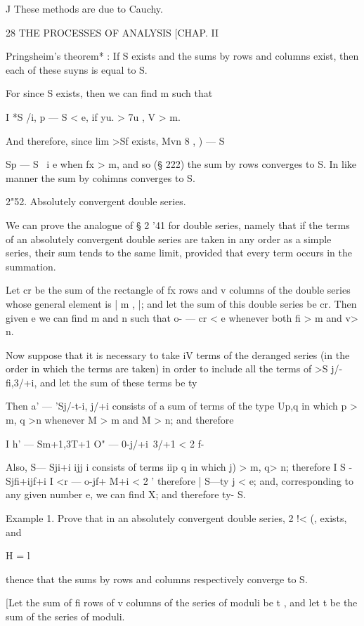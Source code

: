 J These methods are due to Cauchy.



28 THE PROCESSES OF ANALYSIS [CHAP. II

Pringsheim's theorem* : If S exists and the sums by rows and columns
exist, then each of these suyns is equal to S.

For since S exists, then we can find m such that

I *S /i, p — S < e, if yu. > 7u , V > m.

And therefore, since lim >Sf exists, Mvn 8 , ) — S %

  Sp — S \ i e when fx > m, and so (§ 222) the sum by rows converges
to S. In like manner the sum by cohimns converges to S.

2"52. Absolutely convergent double series.

We can prove the analogue of § 2 '41 for double series, namely that if
the terms of an absolutely convergent double series are taken in any
order as a simple series, their sum tends to the same limit, provided
that every term occurs in the summation.

Let cr be the sum of the rectangle of fx rows and v columns of the
double series whose general element is | m , |; and let the sum of
this double series be cr. Then given e we can find m and n such that
o- — cr < e whenever both fi > m and v> n.

Now suppose that it is necessary to take iV terms of the deranged
series (in the order in which the terms are taken) in order to include
all the terms of >S j/-fi,3/+i, and let the sum of these terms be ty

Then a' — 'Sj/-t-i, j/+i consists of a sum of terms of the type Up,q
in which p > m, q >n whenever M > m and M > n; and therefore

I h' — Sm+1,3T+1 O" — 0-j/+i\ 3/+1 < 2 f-

Also, S— Sji+i ijj i consists of terms iip q in which j) > m, q> n;
therefore I S - Sjfi+ijf+i I <r — o-jf+ M+i < 2 ' therefore | S—ty j <
e; and, corresponding to any given number e, we can find X; and
therefore ty- S.

Example 1. Prove that in an absolutely convergent double series, 2 !<
(, exists, and

H = l

thence that the sums by rows and columns respectively converge to S.

[Let the sum of fi rows of v columns of the series of moduli be t ,
and let t be the sum of the series of moduli.

